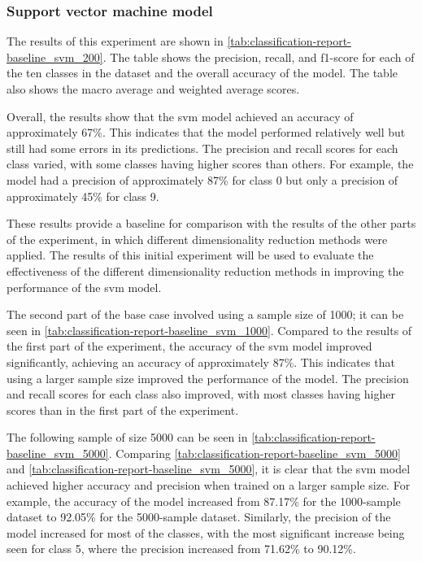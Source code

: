 \subsubsection{Support vector machine model}\label{subsubsec:experiment_4_no_dimmensionality_reduction}






The results of this experiment are shown in \autoref{tab:classification-report-baseline_svm_200}. The table shows the precision, recall, and f1-score for each of the ten classes in the dataset and the overall accuracy of the model. The table also shows the macro average and weighted average scores.

Overall, the results show that the \gls{svm} model achieved an accuracy of approximately 67\%. This indicates that the model performed relatively well but still had some errors in its predictions. The precision and recall scores for each class varied, with some classes having higher scores than others. For example, the model had a precision of approximately 87\% for class 0 but only a precision of approximately 45\% for class 9.

These results provide a baseline for comparison with the results of the other parts of the experiment, in which different dimensionality reduction methods were applied. The results of this initial experiment will be used to evaluate the effectiveness of the different dimensionality reduction methods in improving the performance of the \gls{svm} model.

The second part of the base case involved using a sample size of 1000; it can be seen in \ref{tab:classification-report-baseline_svm_1000}. Compared to the results of the first part of the experiment, the accuracy of the \gls{svm} model improved significantly, achieving an accuracy of approximately 87\%. This indicates that using a larger sample size improved the performance of the model. The precision and recall scores for each class also improved, with most classes having higher scores than in the first part of the experiment.

The following sample of size 5000 can be seen in \autoref{tab:classification-report-baseline_svm_5000}. Comparing \autoref{tab:classification-report-baseline_svm_5000} and \autoref{tab:classification-report-baseline_svm_5000}, it is clear that the \gls{svm} model achieved higher accuracy and precision when trained on a larger sample size. For example, the accuracy of the model increased from 87.17\% for the 1000-sample dataset to 92.05\% for the 5000-sample dataset. Similarly, the precision of the model increased for most of the classes, with the most significant increase being seen for class 5, where the precision increased from 71.62\% to 90.12\%.

